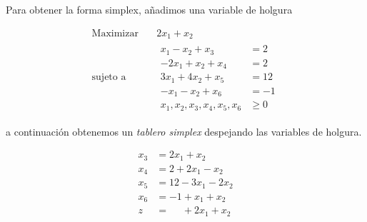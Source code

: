 \documentclass{article}
\begin{document}
Para obtener la forma simplex, añadimos una variable de holgura

\begin{equation*}
 \begin{aligned}
\text{Maximizar} \quad & 2x_{1}+x_{2}\\
\text{sujeto a} \quad &
  \begin{aligned}
   x_{1}-x_{2}+x_3 &= 2\\
   -2x_{1}+x_{2}+x_4 &= 2\\
   3x_{1}+4x_{2}+x_5 &= 12\\
  -x_{1}-x_{2}+x_6 &=-1\\
  x_{1},x_{2},x_3,x_4,x_5,x_6 &\geq 0
  \end{aligned}
\end{aligned}
\end{equation*}

a continuación obtenemos un \emph{tablero simplex} despejando las
variables de holgura.

\begin{equation*}
  \begin{aligned}
  x_3 &= 2x_1+x_2\\
  x_4 &=2+2x_1-x_2\\
  x_5 &=12-3x_1-2x_2\\
  x_6 &=-1+x_1+x_2\\
  \hline
  z &=\phantom{-1} +2x_1+x_2
  
\end{aligned}
\end{equation*}
\end{document}
